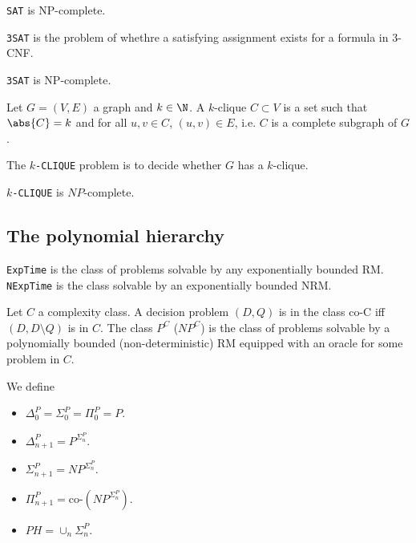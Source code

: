 \documentclass{article}
\begin{document}
\begin{theorem*}
	\texttt{SAT} is NP-complete.	
\end{theorem*}

\begin{definition*}[3SAT]
	\texttt{3SAT} is the problem of whethre a satisfying assignment exists for a 
	formula in 3-CNF.	
\end{definition*}

\begin{theorem*}[II.20]
	\texttt{3SAT} is NP-complete.	
\end{theorem*}

\begin{definition*}[CLIQUE]
	Let $G=(V,E)$ a graph and $k\in\N$. A $k$-clique $C\subset V$ is a 
	set such that $\abs{C} = k$ and for all $u,v\in C$, $(u,v)\in E$,
	i.e. $C$ is a complete subgraph of $G$.

	The \texttt{$k$-CLIQUE} problem is to decide whether $G$ has a $k$-clique.
\end{definition*}

\begin{theorem*}[II.22]
	\texttt{$k$-CLIQUE} is $NP$-complete.	
\end{theorem*}

\subsection{The polynomial hierarchy}

\begin{definition*}[ExpTime]
	\texttt{ExpTime} is the class of problems solvable by any exponentially
	bounded RM. \texttt{NExpTime} is the class solvable by an exponentially
	bounded NRM.	
\end{definition*}

\begin{definition*}
	Let $C$ a complexity class. A decision problem $(D,Q)$ is in the class
	co-C iff $(D, D\setminus Q)$ is in $C$. The class $P^C$ ($NP^C$) is the 
	class of problems solvable by a polynomially bounded (non-deterministic)
	RM equipped with an oracle for some problem in $C$.

	We define 
	\begin{itemize}
		\item $\Delta_0^P=\Sigma_0^P=\Pi_0^P=P$.
		\item $\Delta_{n+1}^P=P^{\Sigma_n^P}$.
		\item $\Sigma_{n+1}^P=NP^{\Sigma_n^P}$.
		\item $\Pi_{n+1}^P=\text{co-}\left(NP^{\Sigma_n^P}\right)$.
		\item $PH=\cup_n \Sigma_n^P$.
	\end{itemize}
\end{definition*}
\end{document}
